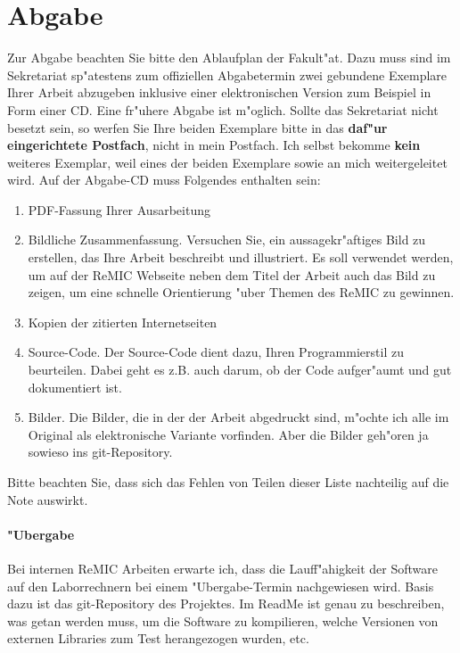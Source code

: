 \documentclass[12pt,a4paper,headinclude,twoside, plainheadsepline, open=right,numbers=noenddot]{scrreprt}
\begin{document}
\section{Abgabe}
\label{abgabe}

Zur Abgabe beachten Sie bitte den Ablaufplan der Fakult"at.
Dazu muss sind im Sekretariat sp"atestens zum offiziellen Abgabetermin zwei gebundene Exemplare Ihrer Arbeit abzugeben inklusive einer elektronischen Version zum Beispiel in Form einer CD.
Eine fr"uhere Abgabe ist m"oglich.
Sollte das Sekretariat nicht besetzt sein, so werfen Sie Ihre beiden Exemplare bitte in das \textbf{daf"ur eingerichtete Postfach}, nicht in mein Postfach.
Ich selbst bekomme \textbf{kein} weiteres Exemplar, weil eines der beiden Exemplare sowie an mich weitergeleitet wird.
Auf der Abgabe-CD muss Folgendes enthalten sein:
\begin{enumerate}
\item PDF-Fassung Ihrer Ausarbeitung
\item Bildliche Zusammenfassung. Versuchen Sie, ein aussagekr"aftiges Bild zu erstellen, das Ihre Arbeit beschreibt und illustriert.
Es soll verwendet werden, um auf der ReMIC Webseite neben dem Titel der Arbeit auch das Bild zu zeigen, um eine schnelle Orientierung "uber Themen des ReMIC zu gewinnen.
\item Kopien der zitierten Internetseiten
\item Source-Code. Der Source-Code dient dazu, Ihren Programmierstil zu beurteilen. Dabei geht es z.B. auch darum, ob der Code aufger"aumt und gut dokumentiert ist.
\item Bilder. Die Bilder, die in der der Arbeit abgedruckt sind, m"ochte ich alle im Original als elektronische Variante vorfinden.
Aber die Bilder geh"oren ja sowieso ins git-Repository.
\end{enumerate}
Bitte beachten Sie, dass sich das Fehlen von Teilen dieser Liste nachteilig auf die Note auswirkt.

\paragraph{"Ubergabe} Bei internen ReMIC Arbeiten erwarte ich, dass die Lauff"ahigkeit der Software auf den Laborrechnern bei einem "Ubergabe-Termin nachgewiesen wird.
Basis dazu ist das git-Repository des Projektes.
Im ReadMe ist  genau zu beschreiben, was getan werden muss, um die Software zu kompilieren, welche Versionen von externen Libraries zum Test herangezogen wurden, etc.
\end{document}
